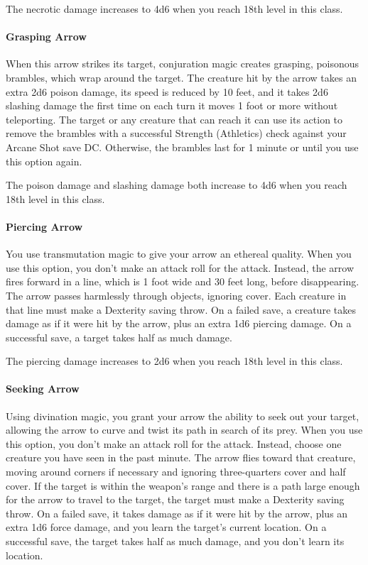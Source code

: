 \documentclass[letterpaper,openany,oneside,twocolumn]{book}
\begin{document}
The necrotic damage increases to 4d6 when you reach 18th level in this class.

\paragraph{Grasping Arrow} When this arrow strikes its target, conjuration magic creates grasping, poisonous brambles, which wrap around the target. The creature hit by the arrow takes an extra 2d6 poison damage, its speed is reduced by 10 feet, and it takes 2d6 slashing damage the first time on each turn it moves 1 foot or more without teleporting. The target or any creature that can reach it can use its action to remove the brambles with a successful Strength (Athletics) check against your Arcane Shot save DC. Otherwise, the brambles last for 1 minute or until you use this option again.

The poison damage and slashing damage both increase to 4d6 when you reach 18th level in this class.

\paragraph{Piercing Arrow} You use transmutation magic to give your arrow an ethereal quality. When you use this option, you don't make an attack roll for the attack. Instead, the arrow fires forward in a line, which is 1 foot wide and 30 feet long, before disappearing. The arrow passes harmlessly through objects, ignoring cover. Each creature in that line must make a Dexterity saving throw. On a failed save, a creature takes damage as if it were hit by the arrow, plus an extra 1d6 piercing damage. On a successful save, a target takes half as much damage.

The piercing damage increases to 2d6 when you reach 18th level in this class.

\paragraph{Seeking Arrow} Using divination magic, you grant your arrow the ability to seek out your target, allowing the arrow to curve and twist its path in search of its prey. When you use this option, you don’t make an attack roll for the attack. Instead, choose one creature you have seen in the past minute. The arrow flies toward that creature, moving around corners if necessary and ignoring three-quarters cover and half cover. If the target is within the weapon's range and there is a path large enough for the arrow to travel to the target, the target must make a Dexterity saving throw. On a failed save, it takes damage as if it were hit by the arrow, plus an extra 1d6 force damage, and you learn the target's current location. On a successful save, the target takes half as much damage, and you don't learn its location.
\end{document}

